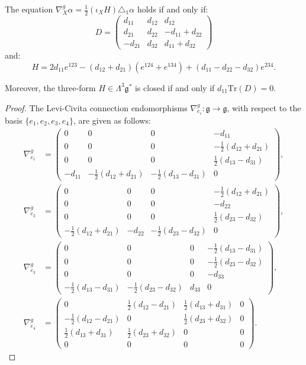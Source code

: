 \documentclass[10pt,a4paper]{amsart}
\newcommand{\Tr}{\mathrm{Tr}}
\begin{document}
\begin{lemma}
    The equation $\nabla^g_X\alpha=\tfrac{1}{2}(\iota_XH)\triangle_1\alpha$ holds if and only if: $$D=\begin{pmatrix}
        d_{11}&d_{12}&d_{12}\\
        d_{21}&d_{22}&-d_{11}+d_{22}\\
        -d_{21}&d_{32}&d_{11}+d_{32}
    \end{pmatrix}$$ and: $$H=2d_{11}e^{123}-(d_{12}+d_{21})(e^{124}+e^{134})+(d_{11}-d_{22}-d_{32})e^{234}.$$
    
    Moreover, the three-form $H\in\Lambda^3\mathfrak{g}^*$ is closed if and only if $d_{11}\Tr(D)=0$.
\end{lemma}

\begin{proof}
    The Levi-Civita connection endomorphisms $\nabla^g_{e_i}\colon\mathfrak{g}\to\mathfrak{g}$, with respect to the basis $\{e_1,e_2,e_3,e_4\}$, are given as follows: \begin{align*}
        \nabla^g_{e_1}&=\left(\begin{smallmatrix}
            0&0&0&-d_{11}\\
            0&0&0&-\frac{1}{2}(d_{12}+d_{21})\\
            0&0&0&\frac{1}{2}(d_{13}-d_{31})\\
            -d_{11}&-\frac{1}{2}(d_{12}+d_{21})&-\frac{1}{2}(d_{13}-d_{31})&0
        \end{smallmatrix}\right),\\
        \nabla^g_{e_2}&=\left(\begin{smallmatrix}
            0&0&0&-\frac{1}{2}(d_{12}+d_{21})\\
            0&0&0&-d_{22}\\
            0&0&0&\frac{1}{2}(d_{23}-d_{32})\\
            -\frac{1}{2}(d_{12}+d_{21})&-d_{22}&-\frac{1}{2}(d_{23}-d_{32})&0
        \end{smallmatrix}\right),\\
        \nabla^g_{e_3}&=\left(\begin{smallmatrix}
            0&0&0&-\frac{1}{2}(d_{13}-d_{31})\\
            0&0&0&-\frac{1}{2}(d_{23}-d_{32})\\
            0&0&0&-d_{33}\\
            -\frac{1}{2}(d_{13}-d_{31})&-\frac{1}{2}(d_{23}-d_{32})&d_{33}&0
        \end{smallmatrix}\right),\\
        \nabla^g_{e_4}&=\left(\begin{smallmatrix}
            0&\frac{1}{2}(d_{12}-d_{21})&\frac{1}{2}(d_{13}+d_{31})&0\\
            -\frac{1}{2}(d_{12}-d_{21})&0&\frac{1}{2}(d_{23}+d_{32})&0\\
            \frac{1}{2}(d_{13}+d_{31})&\frac{1}{2}(d_{23}+d_{32})&0&0\\
            0&0&0&0
        \end{smallmatrix}\right).
    \end{align*}
    

\end{proof}
\end{document}
